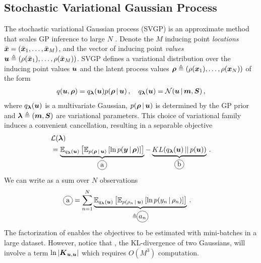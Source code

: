 \subsection{Stochastic Variational Gaussian Process}
\label{sec:SVGP}
The stochastic variational Gaussian process (SVGP) is an approximate method that
scales GP inference to large $N$ \citep{hensman2013gaussian}.
Denote the $M$ inducing point \emph{locations} $\bar{\boldsymbol{x}} = \left( \bar{\boldsymbol{x}}_1, \dots,
\bar{\boldsymbol{x}}_M \right)$, and the vector of inducing point \emph{values}
$\boldsymbol{u} \triangleq \left( \rho(\bar{\boldsymbol{x}}_1), \dots, \rho(\bar{\boldsymbol{x}}_M) \right)$.
SVGP defines a variational distribution over the inducing point 
values $\boldsymbol{u}$ and the latent process values
$\boldsymbol{\rho} \triangleq \left(\rho(\boldsymbol{x}_1), \dots, \rho(\boldsymbol{x}_N) \right)$ of the form
\begin{align*}
    q(\boldsymbol{u}, \boldsymbol{\rho}) = q_{{\boldsymbol{\lambda}}}(\boldsymbol{u}) p(\boldsymbol{\rho} \,|\, \boldsymbol{u}) \, , \quad
    q_{{\boldsymbol{\lambda}}}(\boldsymbol{u}) = \mathcal{N}(\boldsymbol{u} \,|\, \boldsymbol{m}, \boldsymbol{S}) \,,
\end{align*}
where $q_{\boldsymbol{\lambda}}(\boldsymbol{u})$ is a multivariate Gaussian,
$p(\boldsymbol{\rho} \,|\, \boldsymbol{u})$ is determined by the GP prior
and ${\boldsymbol{\lambda}} \triangleq (\boldsymbol{m}, \boldsymbol{S})$ are variational parameters.
This choice of variational family induces a convenient cancellation, resulting
in a separable objective
\citep{titsias2009variational}
\begin{align}
&\mathcal{L}(\blambda) \label{eq:svgp-elbo} \\
  &= \underbrace{\mathbb{E}_{q_{\blambda}(\bu)}\left[
      \mathbb{E}_{p(\brho \given \bu)} \left[ \ln p(\by \given \brho) \right]
    \right]}_{\circled{a}} -
    \underbrace{KL(q_{\blambda}(\bu)\,||\,p(\bu))}_{\circled{b}} \nonumber\,.
\end{align}
We can write  as a sum over $N$ observations
\begin{align}
    \circled{a}
    &= \sum_{n=1}^N \underbrace{
          \mathbb{E}_{q_{\blambda}(\bu)}\left[
              \mathbb{E}_{p(\rho_n \given \bu)} \left[
                  \ln p(y_n \given \rho_n)
              \right]
          \right]
        }_{\triangleq \circled{$a_n$}} \,.
\end{align}
The factorization of 
enables the objectives to be estimated with mini-batches in a large dataset.
However, notice that , the KL-divergence of two Gaussians,
will involve a term $\ln |\boldsymbol{K}_{\boldsymbol{u},\boldsymbol{u}}|$
which requires $O(M^3)$ computation.

